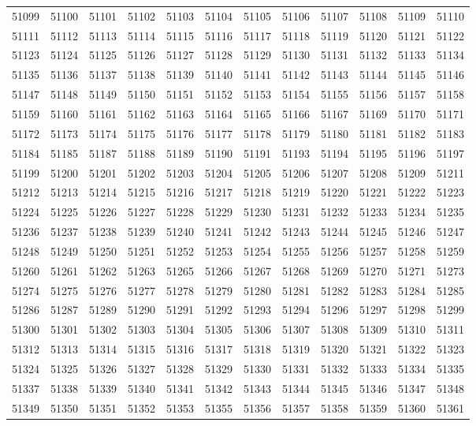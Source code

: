 \begin{center}
\begin{longtable}{llllllllllll}
51099 &51100 &51101 &51102 &51103 &51104 &51105 &51106 &51107 &51108 &51109 &51110 \\
51111 &51112 &51113 &51114 &51115 &51116 &51117 &51118 &51119 &51120 &51121 &51122 \\
51123 &51124 &51125 &51126 &51127 &51128 &51129 &51130 &51131 &51132 &51133 &51134 \\
51135 &51136 &51137 &51138 &51139 &51140 &51141 &51142 &51143 &51144 &51145 &51146 \\
51147 &51148 &51149 &51150 &51151 &51152 &51153 &51154 &51155 &51156 &51157 &51158 \\
51159 &51160 &51161 &51162 &51163 &51164 &51165 &51166 &51167 &51169 &51170 &51171 \\
51172 &51173 &51174 &51175 &51176 &51177 &51178 &51179 &51180 &51181 &51182 &51183 \\
51184 &51185 &51187 &51188 &51189 &51190 &51191 &51193 &51194 &51195 &51196 &51197 \\
51199 &51200 &51201 &51202 &51203 &51204 &51205 &51206 &51207 &51208 &51209 &51211 \\
51212 &51213 &51214 &51215 &51216 &51217 &51218 &51219 &51220 &51221 &51222 &51223 \\
51224 &51225 &51226 &51227 &51228 &51229 &51230 &51231 &51232 &51233 &51234 &51235 \\
51236 &51237 &51238 &51239 &51240 &51241 &51242 &51243 &51244 &51245 &51246 &51247 \\
51248 &51249 &51250 &51251 &51252 &51253 &51254 &51255 &51256 &51257 &51258 &51259 \\
51260 &51261 &51262 &51263 &51265 &51266 &51267 &51268 &51269 &51270 &51271 &51273 \\
51274 &51275 &51276 &51277 &51278 &51279 &51280 &51281 &51282 &51283 &51284 &51285 \\
51286 &51287 &51289 &51290 &51291 &51292 &51293 &51294 &51296 &51297 &51298 &51299 \\
51300 &51301 &51302 &51303 &51304 &51305 &51306 &51307 &51308 &51309 &51310 &51311 \\
51312 &51313 &51314 &51315 &51316 &51317 &51318 &51319 &51320 &51321 &51322 &51323 \\
51324 &51325 &51326 &51327 &51328 &51329 &51330 &51331 &51332 &51333 &51334 &51335 \\
51337 &51338 &51339 &51340 &51341 &51342 &51343 &51344 &51345 &51346 &51347 &51348 \\
51349 &51350 &51351 &51352 &51353 &51355 &51356 &51357 &51358 &51359 &51360 &51361 \\

\end{longtable}
\end{center}
